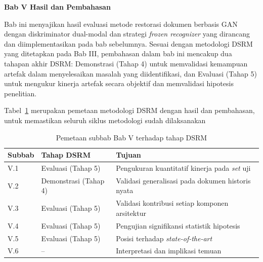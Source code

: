 \documentclass[12pt,a4paper]{article}
\begin{document}


\vspace{2cm}
\begin{center}
    {\fontsize{14}{16.8}\selectfont\textbf{Bab V \quad Hasil dan Pembahasan}}
\end{center}
\label{sec:hasil-dan-pembahasan}
\setcounter{section}{5}
\setcounter{subsection}{0}
\setcounter{table}{0}
\setcounter{figure}{0}

Bab ini menyajikan hasil evaluasi metode restorasi dokumen berbasis GAN dengan diskriminator dual-modal dan strategi \textit{frozen recognizer} yang dirancang dan diimplementasikan pada bab sebelumnya. Sesuai dengan metodologi DSRM yang ditetapkan pada Bab III, pembahasan dalam bab ini mencakup dua tahapan akhir DSRM: Demonstrasi (Tahap 4) untuk memvalidasi kemampuan artefak dalam menyelesaikan masalah yang diidentifikasi, dan Evaluasi (Tahap 5) untuk mengukur kinerja artefak secara objektif dan memvalidasi hipotesis penelitian.

Tabel~\ref{tab:dsrm-mapping} merupakan pemetaan metodologi DSRM dengan hasil dan pembahasan, untuk memastikan seluruh siklus metodologi sudah dilaksanakan

\begin{table}[!htbp]
    \caption[Pemetaan subbab ke tahap DSRM]{Pemetaan subbab Bab V terhadap tahap DSRM}
    \label{tab:dsrm-mapping}
    \small
    \begin{tabularx}{\textwidth}{|>{\raggedright\arraybackslash}l|>{\raggedright\arraybackslash}l|>{\raggedright\arraybackslash}X|}
        \hline
        \textbf{Subbab} & \textbf{Tahap DSRM} & \textbf{Tujuan} \\
        \hline
        V.1 & Evaluasi (Tahap 5) & Pengukuran kuantitatif kinerja pada \textit{set} uji \\
        V.2 & Demonstrasi (Tahap 4) & Validasi generalisasi pada dokumen historis nyata \\
        V.3 & Evaluasi (Tahap 5) & Validasi kontribusi setiap komponen arsitektur \\
        V.4 & Evaluasi (Tahap 5) & Pengujian signifikansi statistik hipotesis \\
        V.5 & Evaluasi (Tahap 5) & Posisi terhadap \textit{state-of-the-art} \\
        V.6 & -- & Interpretasi dan implikasi temuan \\
        \hline
    \end{tabularx}
\end{table}
\end{document}
